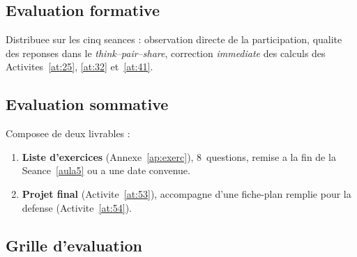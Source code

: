 \documentclass[12pt,a4paper]{scrartcl}
\begin{document}
\subsection{Evaluation formative}
Distribuee sur les cinq seances : observation directe de la participation, qualite des reponses dans le \emph{think--pair--share}, correction \emph{immediate} des calculs des Activites~\ref{at:25}, \ref{at:32} et~\ref{at:41}.

\subsection{Evaluation sommative}
Composee de deux livrables :

\begin{enumerate}[leftmargin=1.5em,itemsep=0.2em,topsep=0.3em,nosep]
  \item \textbf{Liste d'exercices} (Annexe~\ref{ap:exerc}), 8~questions, remise a la fin de la Seance~\ref{aula5} ou a une date convenue.
  \item \textbf{Projet final} (Activite~\ref{at:53}), accompagne d'une fiche-plan remplie pour la defense (Activite~\ref{at:54}).
\end{enumerate}

\subsection{Grille d'evaluation}
\end{document}
